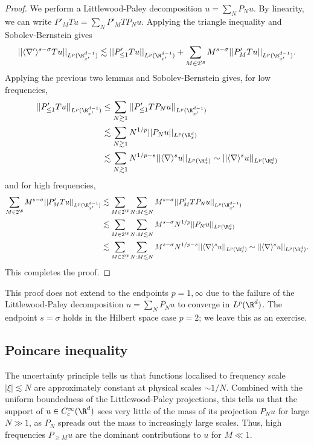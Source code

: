 \begin{proof}
	We perform a Littlewood-Paley decomposition $u = \sum_N P_N u$. By linearity, we can write $P'_M T u = \sum_N P'_M T P_N u$. Applying the triangle inequality and Sobolev-Bernstein gives
		\[ || \langle \nabla' \rangle^{s - \sigma} Tu||_{L^p (\R^{d - 1}_{x'})} \lesssim ||P'_{\leq 1} Tu||_{L^p (\R^{d - 1}_{x'})} +  \sum_{M \in 2^\N} M^{s - \sigma} ||P'_M T u||_{L^p (\R^{d - 1}_{x'})} .\]
	Applying the previous two lemmas and Sobolev-Bernstein gives, for low frequencies, 
		\begin{align*}
			||P'_{\leq 1} Tu||_{L^p (\R^{d - 1}_{x'})}
				&\leq\sum_{N \gtrsim 1}
			||P'_{\leq 1} T P_N u||_{L^p (\R^{d - 1}_{x'})}\\
				&\lesssim \sum_{N \gtrsim 1} N^{1/p} ||P_{N} u||_{L^p (\R^d_x)} \\
				&\lesssim  \sum_{N \gtrsim 1} N^{1/p - s} ||\langle \nabla \rangle^s u||_{L^p (\R^d_x)} \sim   ||\langle \nabla \rangle^s u||_{L^p (\R^d_x)}
		\end{align*}
	and for high frequencies, 
		\begin{align*}
			\sum_{M \in 2^\N} M^{s - \sigma} ||P'_M T u||_{L^p (\R^{d - 1}_{x'})}
				&\lesssim \sum_{M \in 2^\N} \sum_{N : M \lesssim N} M^{s - \sigma} ||P'_M T P_N u||_{L^p (\R^{d - 1}_{x'})}\\
				&\lesssim \sum_{M \in 2^\N} \sum_{N : M \lesssim N} M^{s - \sigma} N^{1/p} || P_N u||_{L^p (\R^{d}_{x})} \\
				&\lesssim \sum_{M \in 2^\N} \sum_{N : M \lesssim N} M^{s - \sigma} N^{1/p - s} || \langle \nabla \rangle^s u||_{L^p (\R^{d}_x)} \sim ||\langle \nabla \rangle^s u||_{L^p (\R^d_x)}.
		\end{align*}
	This completes the proof. 
\end{proof}

\begin{remark}
	This proof does not extend to the endpoints $p = 1, \infty$ due to the failure of the Littlewood-Paley decomposition $u = \sum_N P_N u$ to converge in $L^p (\R^d)$. The endpoint $s = \sigma$ holds in the Hilbert space case $p = 2$; we leave this as an exercise. 
\end{remark}

\subsection{Poincare inequality}

The uncertainty principle tells us that functions localised to frequency scale $|\xi| \lesssim N$ are approximately constant at physical scales $\sim 1/N$. Combined with the uniform boundedness of the Littlewood-Paley projections, this tells us that the support of $u \in C^\infty_c (\R^d)$ sees very little of the mass of its projection $P_N u$ for large $N\gg 1$, as $P_N$ spreads out the mass to increasingly large scales. Thus, high frequencies $P_{\geq M} u$ are the dominant contributions to $u$ for $M \ll 1$. 

